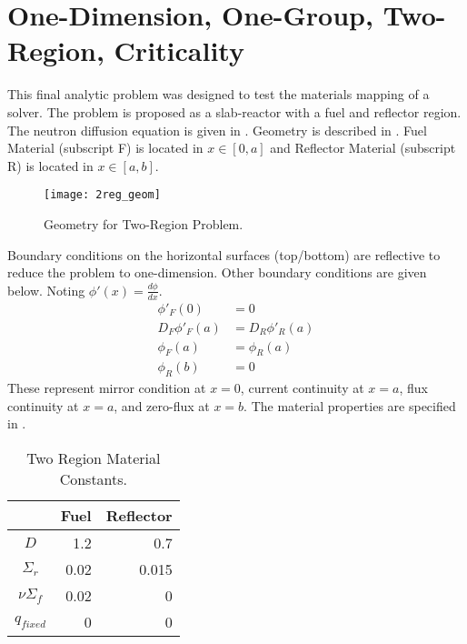 \section{One-Dimension, One-Group, Two-Region, Criticality}
  \label{sec:deriv_2reg}
  This final analytic problem was designed to test the materials mapping of a
  solver. The problem is proposed as a slab-reactor with a fuel and  reflector
  region. The neutron diffusion equation is given in  . 
  Geometry is described in . Fuel Material (subscript F) 
  is located in $x \in [0,a]$ and Reflector Material (subscript R) is located in
  $x \in [a,b]$.
  \begin{figure}
    \centering
    \texttt{[image: 2reg\_geom]}
    \caption{Geometry for Two-Region Problem.}
    \label{fig:2reg_geom}
  \end{figure}
  Boundary conditions on the horizontal surfaces (top/bottom) are reflective
  to reduce the problem to one-dimension. Other boundary conditions are given
  below. Noting $\phi'(x) = \frac{d \phi}{dx}$.
  \begin{align}
    \label{eq:2reg_mirror}
    \phi'_F(0)&=0\\
    \label{eq:2reg_continuity}
    D_F\phi'_F(a)&=D_R\phi'_R(a) \\
    \label{eq:2reg_fluxcontinuity}
    \phi_F(a) &= \phi_R(a) \\
    \label{eq:2reg_zeroflux}
    \phi_R(b)&=0
  \end{align}
  These represent mirror condition at $x=0$, current continuity at $x=a$, flux
  continuity at $x=a$, and zero-flux at $x=b$. The material properties are 
  specified in .
  \begin{table}
    \caption{Two Region Material Constants.}
    \label{tab:2reg_constants}
    \begin{center}
      \begin{tabular}{crr}
        \toprule
        & Fuel & Reflector \\
        \midrule
        $D$ & 1.2 & 0.7 \\
        $\Sigma_r$ & 0.02 & 0.015 \\
        $\nu \Sigma_f$ & 0.02 & 0 \\
        $q_{fixed}$ & 0 & 0 \\
        \bottomrule
      \end{tabular}
    \end{center}
  \end{table}
  

